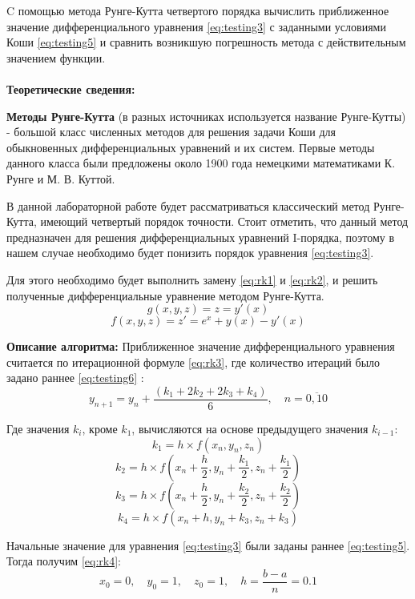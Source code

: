 \documentclass[a4paper, 12pt]{article}   	%
\begin{document}
 
 C помощью метода Рунге-Кутта четвертого порядка вычислить приближенное значение дифференциального уравнения \eqref{eq:testing3} с заданными условиями Коши \eqref{eq:testing5} и сравнить возникшую погрешность метода с действительным значением функции.
\\\\

\textbf{Теоретические сведения:}

\textbf{Методы Рунге-Кутта} (в разных источниках используется название Рунге-Кутты) - большой класс численных методов для решения задачи Коши для обыкновенных дифференциальных уравнений и их систем. Первые методы данного класса были предложены около 1900 года немецкими математиками К. Рунге и М. В. Куттой.

В данной лабораторной работе будет рассматриваться классический метод Рунге-Кутта, имеющий четвертый порядок точности. Стоит отметить, что данный метод предназначен для решения дифференциальных уравнений I-порядка, поэтому в нашем случае необходимо будет понизить порядок уравнения \eqref{eq:testing3}.

Для этого необходимо будет выполнить замену \eqref{eq:rk1} и \eqref{eq:rk2}, и решить полученные дифференциальные уравнение методом Рунге-Кутта.
 \begin{equation}\label{eq:rk1}
g(x, y, z) = z = y'(x)
 \end{equation}
 \begin{equation}\label{eq:rk2}
f(x, y, z) = z' = e^x + y(x) - y'(x)
 \end{equation}
 
 \textbf{Описание алгоритма: }
 Приближенное значение дифференциального уравнения считается по итерационной формуле \eqref{eq:rk3}, где количество итераций было задано раннее \eqref{eq:testing6} :
 \begin{equation}\label{eq:rk3}
y_{n+1} = y_n + \frac {(k_1 + 2 k_2 + 2 k_3 + k_4)}{6}, \quad n = \overline{0, 10}
 \end{equation}
 
 Где значения $k_i$, кроме $k_1$, вычисляются на основе предыдущего значения $k_{i-1}$: 
 $$ k_1 = h \times f(x_n, y_n, z_n) $$
 $$ k_2 = h \times f(x_n + \frac{h}{2}, y_n + \frac{k_1}{2}, z_n + \frac{k_1}{2}) $$
 $$ k_3 = h \times f(x_n + \frac{h}{2}, y_n + \frac{k_2}{2}, z_n + \frac{k_2}{2}) $$
 $$ k_4 = h \times f(x_n + h, y_n + k_3, z_n + k_3) $$
 
 Начальные значение для уравнения \eqref{eq:testing3} были заданы раннее \eqref{eq:testing5}. Тогда получим \eqref{eq:rk4}:
 \begin{equation}\label{eq:rk4}
 x_0 = 0, \quad y_0 = 1, \quad z_0 = 1, \quad h = \frac{b-a}{n}= 0.1
 \end{equation}
 
\end{document}
